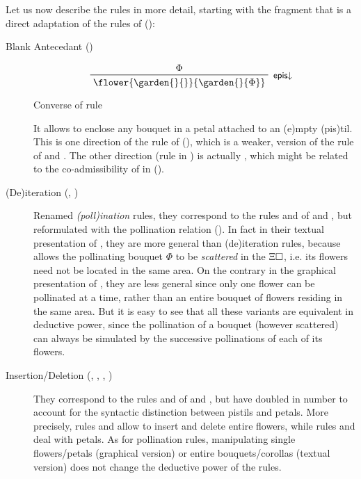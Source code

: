 \begin{scope}
Let us now describe the rules in more detail, starting with the fragment that is
a direct adaptation of the rules of  ():

\begin{description}
  \item[Blank Antecedant ()]
    
    \begin{marginfigure}
      $$
      \R[\rsf{epis{\da}}]
        {\Phi}
        {\flower{\garden{{}}{{}}}{\garden{{}}{\Phi}}}
      $$
      \caption{Converse of  rule}
    \end{marginfigure}

    It allows to enclose any bouquet in a petal attached to an \textsf{(e)}mpty
    \textsf{(pis)}til. This is one direction of the rule  of
    (), which is a weaker,  version
    of the  rule  of  and . The
    other direction (rule  in ) is
    actually , which might be related to the co-admissibility of
     in  ().

  \item[(De)iteration (, )]
    Renamed \emph{\textsf{(poll)}ination} rules, they correspond to the rules
     and  of  and , but reformulated
    with the pollination relation (). In fact in their
    textual presentation of , they are more general than
    (de)iteration rules, because  allows the pollinating
    bouquet $\Phi$ to be \emph{scattered} in the  $\Xi\square$, i.e. its
    flowers need not be located in the same area. On the contrary in the
    graphical presentation of , they are less general
    since only one flower can be pollinated at a time, rather than an entire
    bouquet of flowers residing in the same area. But it is easy to see that all
    these variants are equivalent in deductive power, since the pollination of a
    bouquet (however scattered) can always be simulated by the successive
    pollinations of each of its flowers.

  \item[Insertion/Deletion (, , , )]
    They correspond to the rules  and  of  and
    , but have doubled in number to account for the syntactic
    distinction between pistils and petals. More precisely, rules  and
     allow to insert and delete entire flowers, while rules 
    and  deal with petals. As for pollination rules, manipulating
    single flowers/petals (graphical version) or entire bouquets/corollas
    (textual version) does not change the deductive power of the rules.
    

\end{description}
\end{scope}
